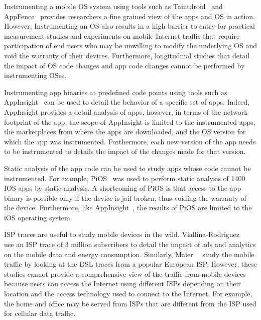 Instrumenting a mobile OS system using tools such as Taintdroid~\cite{enck:taintdroid} and AppFence~\cite{hornyack:appfence} provides researchers a fine grained view of the apps and OS in action. 
However, Instrumenting an OS also results in a high barrier to entry for practical measurement studies and experiments on mobile Internet traffic that require participation of end users  who may be unwilling to modify the underlying OS and void the warranty of their devices. 
Furthermore, longitudinal studies that detail the impact of OS code changes and app code changes cannot be performed by instrumenting OSes.


Instrumenting app binaries at predefined code points using tools such as AppInsight~\cite{ravindranath:appinsight} can be used to detail the behavior of a specific set of apps. 
Indeed, AppInsight provides a detail analysis of apps, however, in terms of the network footprint of the app, the scope of AppInsight is limited to the instrumented apps, the marketplaces from where the apps are downloaded, and the OS version for which the app was instrumented.
Furthermore, each new version of the app needs to be instrumented to details the impact of the changes made for that version.

Static analysis of the app code can be used to study apps whose code cannot be instrumented. 
For example, PiOS~\cite{egele:pios} was used to perform static analysis of 1400 IOS apps by static analysis. 
A shortcoming of PiOS is that access to the app binary is possible only if the device is jail-broken,  thus voiding the warranty of the device.
Furthermore, like AppInsight~\cite{ravindranath:appinsight}, the results of PiOS are limited to the iOS operating system. 

ISP traces are useful to study mobile devices in the wild. 
Viallina-Rodriguez~\etal~\cite{vallina-rod:ads} use an ISP trace of 3 million subscribers to detail the impact of ads and analytics on the mobile data and energy consumption. 
Similarly, Maier~\etal~\cite{maier:mobtraffic} study the mobile traffic by looking at the DSL traces from a popular European ISP. 
However, these studies cannot provide a comprehensive view of the traffic from mobile devices because users can access the Internet using different ISPs depending on their location and the access technology used to connect to the Internet. 
For example, the home \wifi and office \wifi may be served from ISPs that are different from the ISP used for cellular data traffic.

